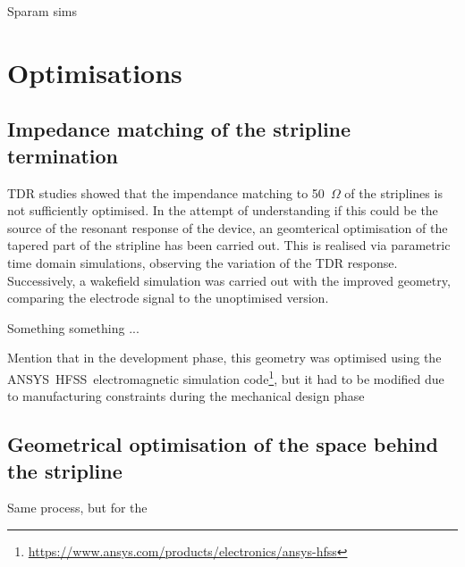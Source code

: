 Sparam sims





\section[Optimisations]{Optimisations}

\subsection[Impedance matching of the stripline termination]{Impedance matching of the stripline termination}

TDR studies showed that the impendance matching to 50~$\Omega$ of the striplines is not sufficiently optimised. In the attempt of understanding if this could be the source of the resonant response of the device, an geomterical optimisation of the tapered part of the stripline has been carried out. This is realised via parametric time domain simulations, observing the variation of the TDR response. Successively, a wakefield simulation was carried out with the improved geometry, comparing the electrode signal to the unoptimised version.

Something something ...

Mention that in the development phase, this geometry was optimised using the ANSYS\textregistered~HFSS\texttrademark~electromagnetic simulation code\footnote{\url{https://www.ansys.com/products/electronics/ansys-hfss}}, but it had to be modified due to manufacturing constraints during the mechanical design phase\cite{Victor:private-comm}


\subsection[Geometrical optimisation of the space behind the stripline]{Geometrical optimisation of the space behind the stripline}

Same process, but for the
